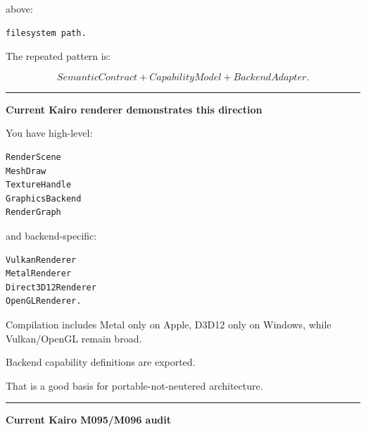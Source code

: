 above:

\begin{verbatim}
filesystem path.
\end{verbatim}

The repeated pattern is:

\[
\boxed{
SemanticContract
+
CapabilityModel
+
BackendAdapter.
}
\]

\begin{center}\rule{0.5\linewidth}{0.5pt}\end{center}

\textbf{Current Kairo renderer demonstrates this direction}

You have high-level:

\begin{verbatim}
RenderScene
MeshDraw
TextureHandle
GraphicsBackend
RenderGraph
\end{verbatim}

and backend-specific:

\begin{verbatim}
VulkanRenderer
MetalRenderer
Direct3D12Renderer
OpenGLRenderer.
\end{verbatim}

Compilation includes Metal only on Apple, D3D12 only on Windows, while Vulkan/OpenGL remain broad.

Backend capability definitions are exported.

That is a good basis for portable-not-neutered architecture.

\begin{center}\rule{0.5\linewidth}{0.5pt}\end{center}

\textbf{Current Kairo M095/M096 audit}

